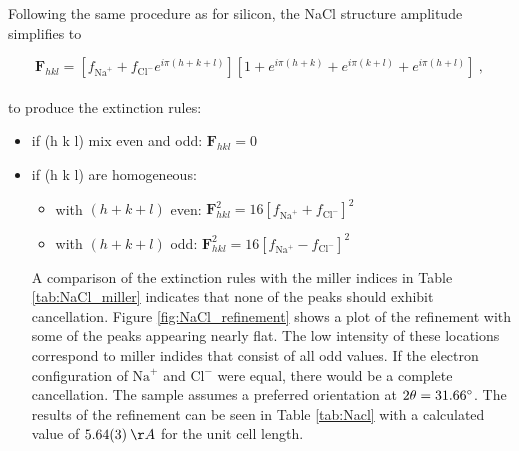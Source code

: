 \documentclass[12pt]{article}
\begin{document}
\noindent
Following the same procedure as for silicon, the NaCl structure amplitude  simplifies to

\begin{equation}
\textbf{F}_{hkl} = \left[ f_{\text{Na}^+} + f_{\text{Cl}^-}e^{i\pi (h+k+l)} \right]\left[1 + e^{i\pi (h+k)} + e^{i\pi (k+l)} + e^{i\pi (h+l) } \right]\:,
\end{equation}\\
\noindent
to produce the extinction rules:

\begin{itemize}
\item if (h k l) mix even and odd: $\textbf{F}_{hkl}=0$
\item if (h k l) are homogeneous:
\begin{itemize}
\item[\textbullet] with $(h + k + l)$ even: $\textbf{F}^2_{hkl}=16\left[ f_{\text{Na}^+} + f_{\text{Cl}^-} \right]^2$\\
\item[\textbullet] with $(h + k + l)$ odd: $\textbf{F}^2_{hkl}=16\left[ f_{\text{Na}^+} - f_{\text{Cl}^-} \right]^2$
\end{itemize}
\vspace{5mm} 
 

\noindent
A comparison of the extinction rules with the miller indices in Table \ref{tab:NaCl_miller} indicates that none of the peaks should exhibit cancellation.  Figure \ref{fig:NaCl_refinement} shows a plot of the refinement with some of the peaks appearing nearly flat. The low intensity of these locations correspond to miller indides that consist of all odd values. If the electron configuration of $\text{Na}^+$ and $\text{Cl}^-$ were equal, there would be a complete cancellation. The sample assumes a preferred orientation at $2\theta = 31.66\degree$. The results of the refinement can be seen in Table \ref{tab:Nacl} with a calculated value of $5.64(3)\:\AA$ for the unit cell length.
\end{itemize}
\end{document}
